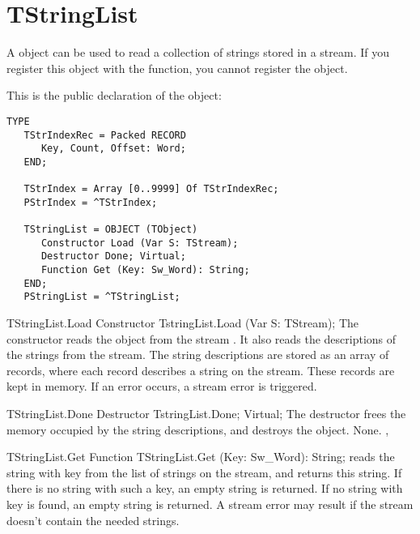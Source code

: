 \section{TStringList}
\label{se:TStringList}

A  object can be used to read a collection of strings
stored in a stream. If you register this object with the 
function, you cannot register the  object.

This is the public declaration of the  object:
\begin{verbatim}
TYPE
   TStrIndexRec = Packed RECORD
      Key, Count, Offset: Word;
   END;

   TStrIndex = Array [0..9999] Of TStrIndexRec;
   PStrIndex = ^TStrIndex;

   TStringList = OBJECT (TObject)
      Constructor Load (Var S: TStream);
      Destructor Done; Virtual;
      Function Get (Key: Sw_Word): String;
   END;
   PStringList = ^TStringList;
\end{verbatim}

\begin{procedure}{TStringList.Load}
\Declaration
Constructor TstringList.Load (Var S: TStream);
\Description
The  constructor reads the  object from the
stream . It also reads the descriptions of the strings from the
stream. The string descriptions are stored as an array of 
 records, where each record describes a string on the
stream. These records are kept in memory.
\Errors
If an error occurs, a stream error is triggered.
\SeeAlso
{}
\end{procedure}

\begin{procedure}{TStringList.Done}
\Declaration
Destructor TstringList.Done; Virtual;
\Description
The  destructor frees the memory occupied by the string
descriptions, and destroys the object.
\Errors
None.
\SeeAlso
{}, 
\end{procedure}

\begin{function}{TStringList.Get}
\Declaration
Function TStringList.Get (Key: Sw\_Word): String;
\Description
{} reads the string with key  from the list of strings on the
stream, and returns this string. If there is no string with such a key, an
empty string is returned.
\Errors
If no string with key  is found, an empty string is returned.
A stream error may result if the stream doesn't contain the needed strings.
\SeeAlso
{}
\end{function}

